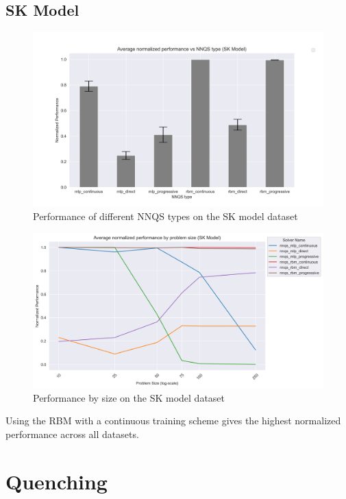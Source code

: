 \subsection{SK Model}
\begin{figure}[!h]
    \centering
    \includegraphics[width=1\linewidth]{images/skmodel_nnqs_avg.png}
    \caption{Performance of different NNQS types on the SK model dataset}
    \label{nnqs-skmodel-average}
\end{figure}

\begin{figure}[!h]
    \centering
    \includegraphics[width=1\linewidth]{images/skmodel_nnqs_size.png}
    \caption{Performance by size on the SK model dataset}
    \label{nnqs-skmodel-size}
\end{figure}

Using the RBM with a continuous training scheme gives the highest normalized performance across all datasets.

\section{Quenching}